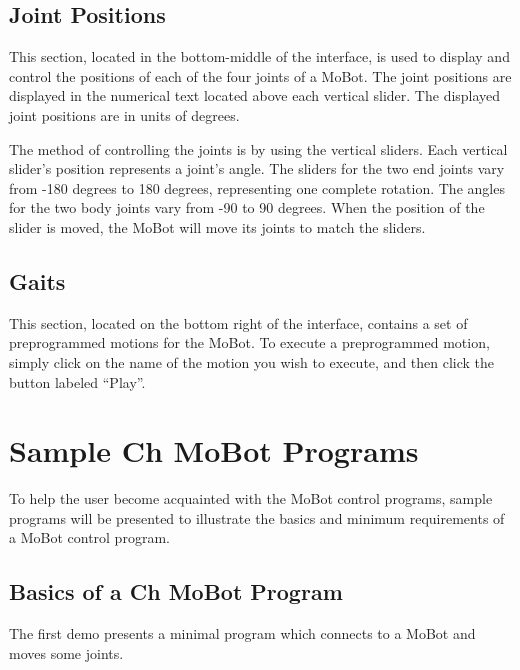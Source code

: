 \documentclass{article}
\begin{document}
\subsection{Joint Positions}
This section, located in the bottom-middle of the interface, is used to display
and control the positions of each of the four
joints of a MoBot. The joint positions are displayed in the numerical
text located above each vertical slider. The displayed joint positions are in
units of degrees.  

The method of controlling the joints is by using the vertical sliders.
Each vertical slider's position represents a joint's angle. The sliders for the
two end joints vary from -180 degrees to 180 degrees, representing one complete
rotation. The angles for the two body joints vary from -90 to 90 degrees. When
the position of the slider is moved, the MoBot will move its joints to match the 
sliders. 

\subsection{Gaits}
This section, located on the bottom right of the interface, contains a set of
preprogrammed motions for the MoBot. To execute a preprogrammed motion, simply
click on the name of the motion you wish to execute, and then click the button
labeled ``Play''.

\section{Sample Ch MoBot Programs}
To help the user become acquainted with the MoBot control programs, sample
programs will be presented to illustrate the basics and minimum requirements of
a MoBot control program. 

\subsection{Basics of a Ch MoBot Program}
The first demo presents a minimal program which connects to a MoBot and
moves some joints.
\end{document}
